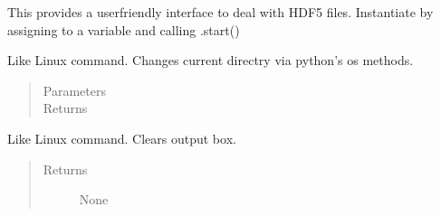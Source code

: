 \documentclass[letterpaper,10pt,english]{sphinxmanual}
\begin{document}
\begin{fulllineitems}
\label{\detokenize{index:HDF5Browser.FileBrowser}}
\sphinxAtStartPar
This provides a user\sphinxhyphen{}friendly interface to deal with HDF5 files. Instantiate by assigning to a variable and calling
.start()

\begin{fulllineitems}
\label{\detokenize{index:HDF5Browser.FileBrowser.__cd}}
\sphinxAtStartPar
Like Linux command. Changes current directry via python’s os methods.
\begin{quote}\begin{description}
\item[{Parameters}] \leavevmode
\sphinxAtStartPar
{} \textendash{} 

\item[{Returns}] \leavevmode
\sphinxAtStartPar


\end{description}\end{quote}

\end{fulllineitems}


\begin{fulllineitems}
\label{\detokenize{index:HDF5Browser.FileBrowser.__cls}}
\sphinxAtStartPar
Like Linux command. Clears output box.
\begin{quote}\begin{description}
\item[{Returns}] \leavevmode
\sphinxAtStartPar
None

\end{description}\end{quote}

\end{fulllineitems}



\end{fulllineitems}
\end{document}
